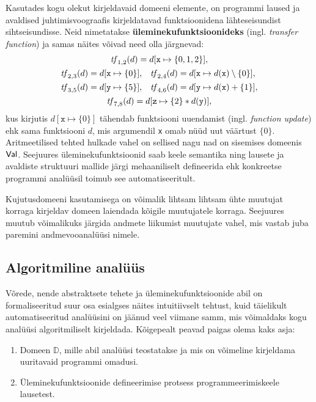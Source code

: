 \documentclass[../thesis.tex]{subfiles}
\begin{document}
Kasutades kogu olekut kirjeldavaid domeeni elemente, on programmi laused ja avaldised juhtimisvoograafis kirjeldatavad funktsioonidena lähteseisundist sihtseisundisse. Neid nimetatakse \textbf{üleminekufunktsioonideks} (ingl. \textit{transfer function}) ja samas näites võivad need olla järgnevad:
\begin{gather*}
	\tf_{1,2}(d) = d[\texttt{x} \mapsto \{0, 1, 2\}], \\
\begin{align*} %
	\tf_{2,3}(d) &= d[\texttt{x} \mapsto \{0\}], &
	\tf_{2,4}(d) &= d[\texttt{x} \mapsto d(\texttt{x}) \setminus \{0\}], \\
	\tf_{3,5}(d) &= d[\texttt{y} \mapsto \{5\}], &
	\tf_{4,6}(d) &= d[\texttt{y} \mapsto d(\texttt{x}) + \{1\}],
\end{align*} \\
	\tf_{7,8}(d) = d[\texttt{z} \mapsto \{2\} * d(\texttt{y})],
\end{gather*}
kus kirjutis $d[\texttt{x} \mapsto \{0\}]$ tähendab funktsiooni uuendamist (ingl. \textit{function update}) ehk sama funktsiooni $d$, mis argumendil \texttt{x} omab nüüd uut väärtust $\{0\}$. Aritmeetilised tehted hulkade vahel on sellised nagu nad on sisemises domeenis $\mathsf{Val}$.
Seejuures üleminekufunktsioonid saab keele semantika ning lausete ja avaldiste struktuuri mallide järgi mehaaniliselt defineerida ehk konkreetse programmi analüüsil toimub see automatiseeritult.

Kujutusdomeeni kasutamisega on võimalik lihtsam lihtsam ühte muutujat korraga kirjeldav domeen laiendada kõigile muutujatele korraga. Seejuures muutub võimalikuks järgida andmete liikumist muutujate vahel, mis vastab juba paremini andmevooanalüüsi nimele.


\subsection{Algoritmiline analüüs}
Võrede, nende abstraktsete tehete ja üleminekufunktsioonide abil on formaliseeritud suur osa esialgses näites intuitiivselt tehtust, kuid täielikult automatiseeritud analüüsini on jäänud veel viimane samm, mis võimaldaks kogu analüüsi algoritmiliselt kirjeldada. Kõigepealt peavad paigas olema kaks asja:
\begin{enumerate}[nosep]
	\item Domeen $\mathbb{D}$, mille abil analüüsi teostatakse ja mis on võimeline kirjeldama uuritavaid programmi omadusi.
	\item Üleminekufunktsioonide defineerimise protsess programmeerimiskeele lausetest.
\end{enumerate}
\end{document}
